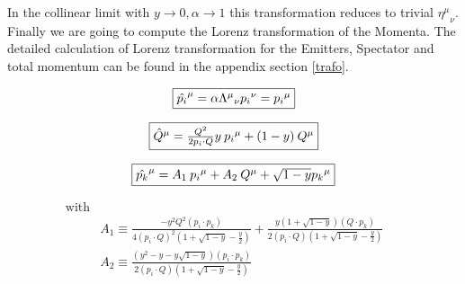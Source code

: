 In the collinear limit with $ y \rightarrow 0, \alpha \rightarrow 1 $
this transformation reduces to trivial $ {\eta^{\mu}}_{\nu} $.
Finally we are going to compute the Lorenz transformation of the Momenta. The detailed calculation of Lorenz transformation for the Emitters, Spectator and total momentum can be found in the appendix section \ref{trafo}.

\begin{equation}
	\begin{aligned}
		\fbox{$  {\hat{{p_i}}}^{\mu}=\alpha{\Lambda^{\mu}}_{\nu} {p_i}^{\nu}= {p_i}^{\mu}$}
    \end{aligned}
\end{equation}

\begin{equation}
	\begin{aligned}
		\fbox{$  {\hat{{Q}}}^{\mu}= \frac{Q^2}{2p_i \cdot Q}y \:{p_i}^{\mu}+(1-y)\:{Q}^{\mu} $}
    \end{aligned}
\end{equation}

\begin{equation}
	\begin{aligned}
		\fbox{$  {\hat{{p_k}}}^{\mu}= A_1 \:{p_i}^{\mu}+A_2\:{Q}^{\mu}+\sqrt{1-y} {p_k}^{\mu} $}
    \end{aligned}
\end{equation}

\begin{equation*}
\begin{split}
\text{with}&\\
	&A_1 \equiv  \frac{-y^2 Q^2 (p_{i}\cdot {p_k})}{4(p_i\cdot Q)^2(1+\sqrt{1-y}-\frac{y}{2})}+ \frac{y(1+\sqrt{1-y})(Q \cdot {p_k})}{2(p_i\cdot Q)(1+\sqrt{1-y}-\frac{y}{2})}\\
		&A_2 \equiv   \frac{(y^2 -y-y\sqrt{1-y}) (p_{i}\cdot {p_k})}{2(p_i\cdot Q)(1+\sqrt{1-y}-\frac{y}{2})}\:\:\:\:\:\:\:\:\:\:\:\:\:\:\:\:\:\:\:\:\:\:\:\:\:\:\:\:\:\:\:\:\:\:\:\:\:\:\:\:\:\:\:\:\:\:\:\:\:\:\:\:\:\:\\\
\end{split}
\end{equation*}



